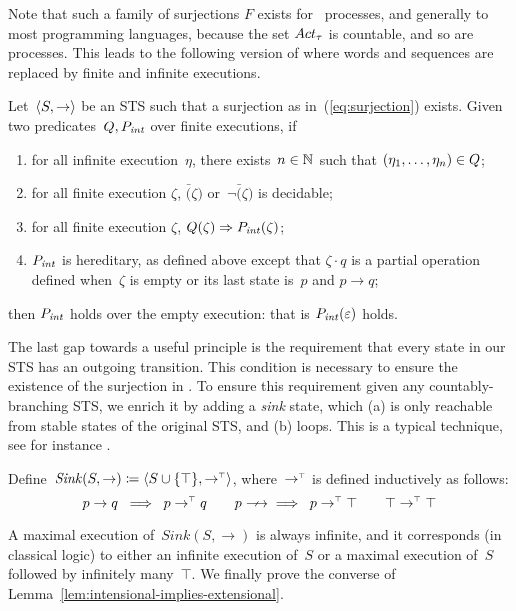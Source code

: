 Note that such a family of surjections $F$ exists for \ACCS\ processes, and
generally to most programming languages, because the set $\Acttau$ is countable,
and so are processes.
%
This leads to the following version of \barinduction where words and
sequences are replaced by finite and infinite executions.
%
\begin{proposition}%
 Let~$\sts{S}{\to}$ be an STS such that a  surjection as in~(\ref{eq:surjection})
 exists. Given two predicates~$\bar, \pint$ over finite executions, if
  \begin{enumerate}
    \item for all infinite execution~$\eta$, there exists~$n \in
      \N$ such that $(\eta_1, \dots, \eta_n) \in \bar$;
    \item for all finite execution $\zeta$,
    $\bar(\zeta)$ or~$\neg \bar(\zeta)$ is decidable;
    \item for all finite execution $\zeta$, $\bar(\zeta) \Rightarrow \pint(\zeta)$;
    \item $\pint$ is hereditary, as defined above except that $\zeta \cdot q$ is a
      partial operation defined when~$\zeta$ is empty or its last state is~$p$
      and $p \to q$;
  \end{enumerate}
then $\pint$ holds over the empty execution: that is $\pint(\varepsilon)$ holds.
\end{proposition}
%
The last gap towards a useful principle is the requirement
that every state in our STS has an outgoing transition.
This condition is necessary to ensure the existence of the
surjection in .
%
To ensure this requirement given any countably-branching STS, we enrich it by
adding a \emph{sink} state, which (a) is only reachable from stable states of
the original STS, and (b) loops. This is a typical technique, see for instance
\cite[pag. 17]{DBLP:books/aw/Lamport2002}.
%
\newcommand{\sinkto}{\mathrel{\to^{\kern-0.3pt\text{\smaller[.5]{\tiny\ensuremath{\top}}}}}}
\begin{definition}
  Define~$\mathit{Sink}(S, \to) \coloneqq \sts{S \cup \set{\top}}{\sinkto}$, where~$\sinkto$ is
  defined inductively as follows:
  \[
    p \to q \;\;\Longrightarrow\;\; p \sinkto q
    \qquad
    p \Nst{} \;\;\Longrightarrow\;\; p \sinkto \top
    \qquad
    \top \sinkto \top
  \]
\end{definition}
%
A maximal execution of~$\mathit{Sink}(S, \to)$ is always infinite, and it
corresponds (in classical logic) to either an infinite execution of~$S$ or a
maximal execution of~$S$ followed by infinitely many~$\top$.
%
We finally prove the converse of Lemma~\ref{lem:intensional-implies-extensional}.

